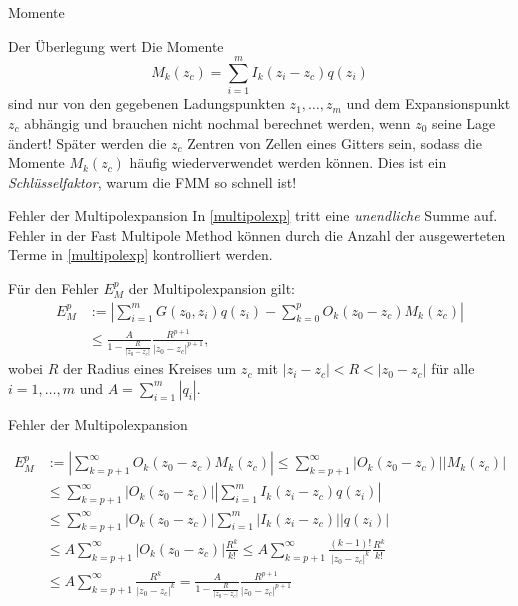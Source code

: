 \documentclass[ngerman]{beamer}
\begin{document}
\begin{frame}{Momente}
\begin{block}{Der Überlegung wert}
Die Momente \[ M_k(z_c) =  \sum_{i=1}^m I_k(z_i-z_c) q(z_i) \] sind nur von den gegebenen Ladungspunkten $z_1,\ldots,z_m$ und dem Expansionspunkt $z_c$ abhängig und brauchen nicht nochmal berechnet werden, wenn $z_0$ seine Lage ändert!
Später werden die $z_c$ Zentren von Zellen eines Gitters sein, sodass die Momente $M_k(z_c)$ häufig wiederverwendet werden können. Dies ist ein \emph{Schlüsselfaktor}, warum die FMM so schnell ist!
\end{block}

\end{frame}
\begin{frame}{Fehler der Multipolexpansion}
In \eqref{multipolexp} tritt eine \emph{unendliche} Summe auf. Fehler in der Fast Multipole Method können durch die Anzahl der ausgewerteten Terme in \eqref{multipolexp} kontrolliert werden.
\begin{Satz}
Für den Fehler $E_M^p$ der Multipolexpansion gilt:
\begin{align*}
E^p_M&:= \left|\sum_{i=1}^m {G(z_0,z_i)q(z_i)} - \sum_{k=0}^p O_k(z_0-z_c)M_k(z_c)\right| \\
&\leq \frac{A}{1-\frac{R}{|z_0-z_c|}}\frac{R^{p+1}}{|z_0-z_c|^{p+1}}, 
\end{align*}
wobei $R$ der Radius eines Kreises um $z_c$ mit $|z_i-z_c| < R < |z_0-z_c|$ für alle $i=1,\ldots,m$ und $A=\sum_{i=1}^m |q_i|$.
\end{Satz}
\end{frame}

\begin{frame}{Fehler der Multipolexpansion}
\footnotesize
\begin{Beweis}
\begin{align*}
E^p_M&:= \left|\sum_{k=p+1}^\infty O_k(z_0-z_c)M_k(z_c)\right| \leq \sum_{k=p+1}^\infty |O_k(z_0-z_c)||M_k(z_c)| \\
&\leq \sum_{k=p+1}^\infty |O_k(z_0-z_c)| \left|\sum_{i=1}^m I_k(z_i-z_c) q(z_i)\right| \\
&\leq \sum_{k=p+1}^\infty |O_k(z_0-z_c)| \sum_{i=1}^m |I_k(z_i-z_c)| |q(z_i)| \\
&\leq A \sum_{k=p+1}^\infty |O_k(z_0-z_c)| \frac{R^k}{k!} \leq A \sum_{k=p+1}^\infty \frac{(k-1)!}{|z_0-z_c|^k} \frac{R^k}{k!} \\
&\leq A \sum_{k=p+1}^\infty \frac{R^k}{|z_0-z_c|^k} = \frac{A}{1-\frac{R}{|z_0-z_c|}}\frac{R^{p+1}}{|z_0-z_c|^{p+1}}
\end{align*}
\end{Beweis}
\end{frame}
\end{document}
